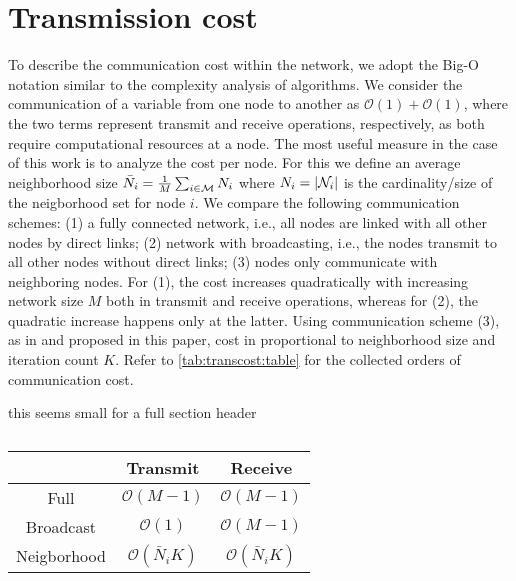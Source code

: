 \documentclass{article}
\begin{document}
\section{Transmission cost}
\label{sec:transcost}
To describe the communication cost within the network, we adopt the Big-O notation similar to the complexity analysis of algorithms.
We consider the communication of a variable from one node to another as \(\mathcal{O}(1)+\mathcal{O}(1)\), where the two terms represent transmit and receive operations, respectively, as both require computational resources at a node.
The most useful measure in the case of this work is to analyze the cost per node.
For this we define an average neighborhood size \(\bar{N}_i = \frac{1}{M} \sum_{i \in \mathcal{M}} N_i\) where \(N_i = | \mathcal{N}_i |\) is the cardinality/size of the neigborhood set for node \(i\).
We compare the following communication schemes: (1) a fully connected network, i.e., all nodes are linked with all other nodes by direct links; (2) network with broadcasting, i.e., the nodes transmit to all other nodes without direct links; (3) nodes only communicate with neighboring nodes.
For (1), the cost increases quadratically with increasing network size \(M\) both in transmit and receive operations, whereas for (2), the quadratic increase happens only at the latter.
Using communication scheme (3), as in \cite{yuDistributedBlindSystem2014,liuDistributedBlindIdentification2016} and proposed in this paper, cost in proportional to neighborhood size and iteration count \(K\).
Refer to \autoref{tab:transcost:table} for the collected orders of communication cost.
\begin{todo}
    this seems small for a full section header
\end{todo}
\begin{table}
    \centering
    \begin{tabular}{ |c|c|c| } 
        \hline
        & Transmit & Receive \\
        \hline\hline
        Full & \(\mathcal{O}(M-1)\) & \(\mathcal{O}(M-1)\) \\
        \hline
        Broadcast & \(\mathcal{O}(1)\) & \(\mathcal{O}(M-1)\) \\ 
        \hline
        Neigborhood & \(\mathcal{O}(\bar{N}_i K)\) & \(\mathcal{O}(\bar{N}_i K)\) \\ 
        \hline
    \end{tabular}
    \caption[]{}
    \label{tab:transcost:table}
\end{table}
\end{document}
